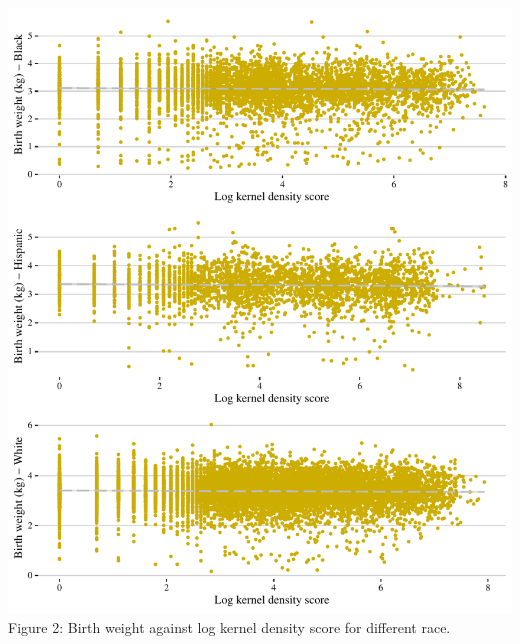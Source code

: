 \documentclass[
  12pt,
]{article}
\begin{document}
\includegraphics{ENV872_FINAL_CW_files/figure-latex/unnamed-chunk-6-1.pdf}
Figure 2: Birth weight against log kernel density score for different
race.
\end{document}
